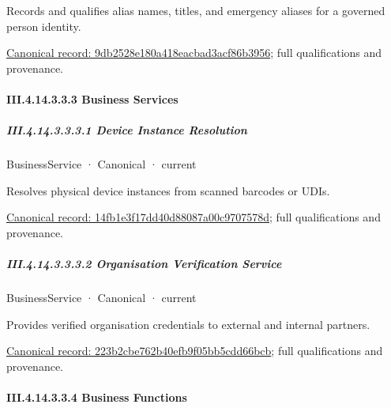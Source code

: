 Records and qualifies alias names, titles, and emergency aliases for a governed person identity.


{\footnotesize \href{../../../../../../../../continuum/business/business-function/9db2528e180a418eacbad3acf86b3956.md}{Canonical record: 9db2528e180a418eacbad3acf86b3956}; full qualifications and provenance.}\par
\paragraph*{III.4.14.3.3.3 Business Services}
\label{navigation:III.4.14.3.3.3}

\subparagraph*{III.4.14.3.3.3.1 Device Instance Resolution}
\label{navigation:III.4.14.3.3.3.1}

\label{element:14fb1e3f17dd40d88087a00c9707578d}
{\small BusinessService · Canonical · current}\par

Resolves physical device instances from scanned barcodes or UDIs.


{\footnotesize \href{../../../../../../../../continuum/business/business-service/14fb1e3f17dd40d88087a00c9707578d.md}{Canonical record: 14fb1e3f17dd40d88087a00c9707578d}; full qualifications and provenance.}\par
\subparagraph*{III.4.14.3.3.3.2 Organisation Verification Service}
\label{navigation:III.4.14.3.3.3.2}

\label{element:223b2cbe762b40efb9f05bb5cdd66bcb}
{\small BusinessService · Canonical · current}\par

Provides verified organisation credentials to external and internal partners.


{\footnotesize \href{../../../../../../../../continuum/business/business-service/223b2cbe762b40efb9f05bb5cdd66bcb.md}{Canonical record: 223b2cbe762b40efb9f05bb5cdd66bcb}; full qualifications and provenance.}\par
\paragraph*{III.4.14.3.3.4 Business Functions}
\label{navigation:III.4.14.3.3.4}

